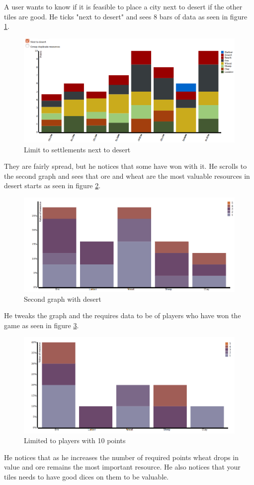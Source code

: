 \documentclass[journal]{vgtc}                %
\begin{document}
A user wants to know if it is feasible to place a city next to desert if the
other tiles are good. He ticks "next to desert" and sees 8 bars of data as
seen in figure \ref{fig:s21}. 
\begin{figure}[!ht]
  \centering
  \includegraphics[width=\linewidth]{scen2-1.png}
  \caption{Limit to settlements next to desert}
  \label{fig:s21}
\end{figure}
\noindent
They are fairly spread, but he notices that some have won with it. He
scrolls to the second graph and sees that ore and wheat are the most valuable
resources in desert starts as seen in figure \ref{fig:s22}. 
\begin{figure}[!ht]
  \centering
  \includegraphics[width=\linewidth]{scen2-2.png}
  \caption{Second graph with desert}
  \label{fig:s22}
\end{figure}
\noindent
He tweaks the graph and the requires data to be
of players who have won the game as seen in figure \ref{fig:s23}. 
\begin{figure}[!ht]
  \centering
  \includegraphics[width=\linewidth]{scen2-3.png}
  \caption{Limited to players with 10 points}
  \label{fig:s23}
\end{figure}
\noindent
He notices that as he increases the number
of required points wheat drops in value and ore remains the most important
resource. He also notices that your tiles needs to have good dices on them to
be valuable.
\end{document}
